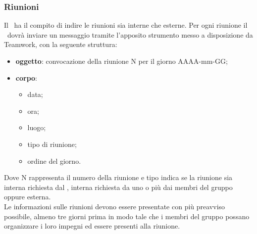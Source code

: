 \documentclass[../NormeProgetto.tex]{subfiles}
\begin{document}
	\subsubsection{Riunioni}
		Il \responsabilediprogetto\ ha il compito di indire le riunioni sia interne che esterne. Per ogni riunione il \responsabilediprogetto\ dovrà inviare un messaggio tramite l'apposito strumento messo a disposizione da Teamwork\g, con la seguente struttura:
		\begin{itemize}
			\item \textbf{oggetto}: convocazione della riunione N per il giorno AAAA-mm-GG;
			\item \textbf{corpo}: 
			\begin{itemize}
				\item data;
				\item ora;
				\item luogo;
				\item tipo di riunione;
				\item ordine del giorno.
				\end{itemize}
		\end{itemize}
		Dove N rappresenta il numero della riunione e tipo indica se la riunione sia interna richiesta dal \responsabilediprogetto, interna richiesta da uno o più dai membri del gruppo oppure esterna. \\
		Le informazioni sulle riunioni devono essere presentate con più preavviso possibile, almeno tre giorni prima in modo tale che i membri del gruppo possano organizzare i loro impegni ed essere presenti alla riunione.
\end{document}
